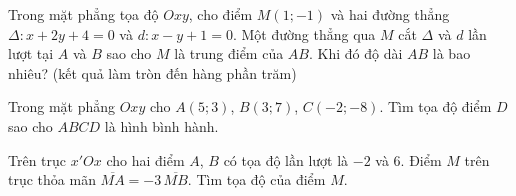 \begin{bt}%
	Trong mặt phẳng tọa độ $Oxy$, cho điểm  $M\left(1;-1\right)$ và hai đường thẳng $\Delta\colon x+2y+4=0$ và $d\colon x-y+1=0$. Một đường thẳng qua $M$ cắt $\Delta$ và $d$ lần lượt tại $A$ và $B$ sao cho $M$ là trung điểm của $AB$. Khi đó độ dài $AB$ là bao nhiêu? (kết quả làm tròn đến hàng phần trăm)
\end{bt}



\begin{bt}%
	Trong mặt phẳng $Oxy$  cho $A(5;3)$, $B(3;7)$, $C(-2;-8)$. Tìm tọa độ điểm $D$ sao cho $ABCD$ là hình bình hành.
\end{bt}

\begin{bt}%
	Trên trục $x'Ox$ cho hai điểm $A$, $B$ có tọa độ lần lượt là $-2$ và $6$. Điểm $M$ trên trục thỏa mãn $\overline{MA}=-3\,\overline{MB}$. Tìm tọa độ của điểm $M$.
\end{bt}

